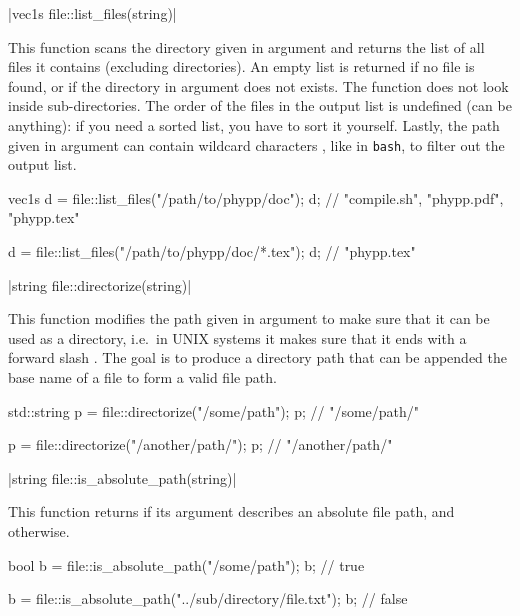 \funcitem \cppinline|vec1s file::list_files(string)| 

This function scans the directory given in argument and returns the list of all files it contains (excluding directories). An empty list is returned if no file is found, or if the directory in argument does not exists. The function does not look inside sub-directories. The order of the files in the output list is undefined (can be anything): if you need a sorted list, you have to sort it yourself. Lastly, the path given in argument can contain wildcard characters \cppinline{*}, like in \texttt{bash}, to filter out the output list.

\begin{example}
\begin{cppcode}
vec1s d = file::list_files("/path/to/phypp/doc");
d; // {"compile.sh", "phypp.pdf", "phypp.tex"}

d = file::list_files("/path/to/phypp/doc/*.tex");
d; // {"phypp.tex"}
\end{cppcode}
\end{example}

\funcitem \vectorfunc \cppinline|string file::directorize(string)| 

This function modifies the path given in argument to make sure that it can be used as a directory, i.e.~in UNIX systems it makes sure that it ends with a forward slash \cppinline{/}. The goal is to produce a directory path that can be appended the base name of a file to form a valid file path.

\begin{example}
\begin{cppcode}
std::string p = file::directorize("/some/path");
p; // "/some/path/"

p = file::directorize("/another/path/");
p; // "/another/path/"
\end{cppcode}
\end{example}

\funcitem \vectorfunc \cppinline|string file::is_absolute_path(string)| 

This function returns  if its argument describes an absolute file path, and  otherwise.

\begin{example}
\begin{cppcode}
bool b = file::is_absolute_path("/some/path");
b; // true

b = file::is_absolute_path("../sub/directory/file.txt");
b; // false
\end{cppcode}
\end{example}


